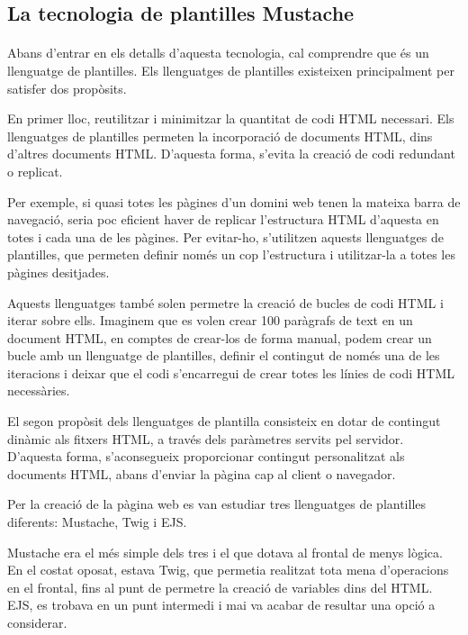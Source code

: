 \subsection{La tecnologia de plantilles Mustache}

    \paragraph{}
    Abans d'entrar en els detalls d'aquesta tecnologia, cal comprendre que és un llenguatge de plantilles. Els llenguatges de plantilles existeixen principalment per satisfer dos propòsits.

    En primer lloc, reutilitzar i minimitzar la quantitat de codi HTML necessari. Els llenguatges de plantilles permeten la incorporació de documents HTML, dins d'altres documents HTML. D'aquesta forma, s'evita la creació de codi redundant o replicat.

    Per exemple, si quasi totes les pàgines d'un domini web tenen la mateixa barra de navegació, seria poc eficient haver de replicar l'estructura HTML d'aquesta en totes i cada una de les pàgines. Per evitar-ho, s'utilitzen aquests llenguatges de plantilles, que permeten definir només un cop l'estructura i utilitzar-la a totes les pàgines desitjades.

    Aquests llenguatges també solen permetre la creació de bucles de codi HTML i iterar sobre ells. Imaginem que es volen crear 100 paràgrafs de text en un document HTML, en comptes de crear-los de forma manual, podem crear un bucle amb un llenguatge de plantilles, definir el contingut de només una de les iteracions i deixar que el codi s'encarregui de crear totes les línies de codi HTML necessàries.

    El segon propòsit dels llenguatges de plantilla consisteix en dotar de contingut dinàmic als fitxers HTML, a través dels paràmetres servits pel servidor. D’aquesta forma, s’aconsegueix proporcionar contingut personalitzat als documents HTML, abans d'enviar la pàgina cap al client o navegador.

    Per la creació de la pàgina web es van estudiar tres llenguatges de plantilles diferents: Mustache, Twig i EJS.

    Mustache era el més simple dels tres i el que dotava al frontal de menys lògica. En el costat oposat, estava Twig, que permetia realitzat tota mena d'operacions en el frontal, fins al punt de permetre la creació de variables dins del HTML. EJS, es trobava en un punt intermedi i mai va acabar de resultar una opció a considerar.

